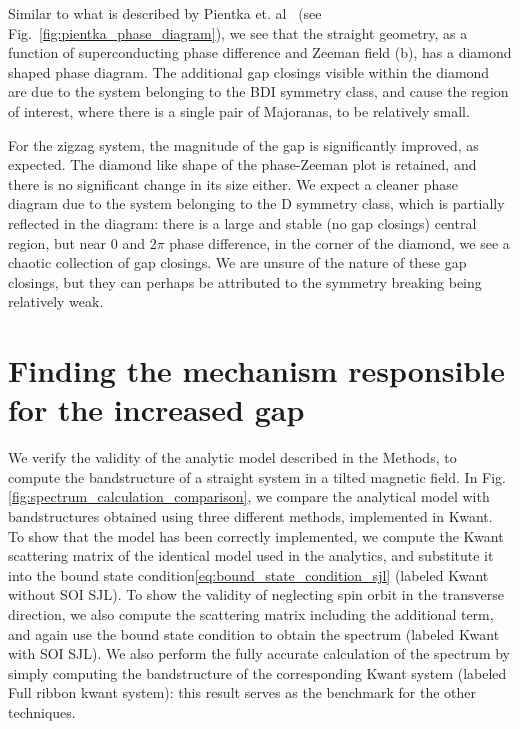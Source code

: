 			Similar to what is described by Pientka et. al~\cite{pientka2017topological} (see Fig.~\ref{fig:pientka_phase_diagram}), we see that the straight geometry, as a function of superconducting phase difference and Zeeman field (b), has a diamond shaped phase diagram.
			The additional gap closings visible within the diamond are due to the system belonging to the BDI symmetry class, and cause the region of interest, where there is a single pair of Majoranas, to be relatively small.
			
			For the zigzag system, the magnitude of the gap is significantly improved, as expected.
			The diamond like shape of the phase-Zeeman plot is retained, and there is no significant change in its size either.
			We expect a cleaner phase diagram due to the system belonging to the D symmetry class, which is partially reflected in the diagram: there is a large and stable (no gap closings) central region, but near 0 and 2$\pi$ phase difference, in the corner of the diamond, we see a chaotic collection of gap closings.
			We are unsure of the nature of these gap closings, but they can perhaps be attributed to the symmetry breaking being relatively weak.



	\section{Finding the mechanism responsible for the increased gap}
		We verify the validity of the analytic model described in the Methods, to compute the bandstructure of a straight system in a tilted magnetic field. 
		In Fig.\ref{fig:spectrum_calculation_comparison}, we compare the analytical model with bandstructures obtained using three different methods, implemented in Kwant.
		To show that the model has been correctly implemented, we compute the Kwant scattering matrix of the identical model used in the analytics, and substitute it into the bound state condition\eqref{eq:bound_state_condition_sjl} (labeled Kwant without SOI SJL).
		To show the validity of neglecting spin orbit in the transverse direction, we also compute the scattering matrix including the additional term, and again use the bound state condition to obtain the spectrum (labeled Kwant with SOI SJL).
		We also perform the fully accurate calculation of the spectrum by simply computing the bandstructure of the corresponding Kwant system (labeled Full ribbon kwant system): this result serves as the benchmark for the other techniques.

